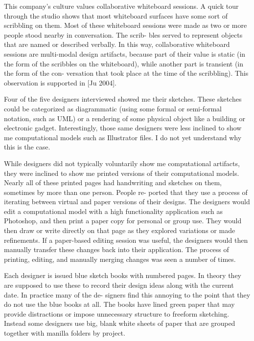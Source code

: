 This company’s culture values collaborative whiteboard sessions. A
quick tour through the studio shows that most whiteboard surfaces have
some sort of scribbling on them. Most of these whiteboard sessions
were made as two or more people stood nearby in conversation. The
scrib- bles served to represent objects that are named or described
verbally. In this way, collaborative whiteboard sessions are
multi-modal design artifacts, because part of their value is static
(in the form of the scribbles on the whiteboard), while another part
is transient (in the form of the con- versation that took place at the
time of the scribbling). This observation is supported in [Ju 2004].

Four of the five designers interviewed showed me their sketches. These
sketches could be categorized as diagrammatic (using some formal or
semi-formal notation, such as UML) or a rendering of some physical
object like a building or electronic gadget. Interestingly, those same
designers were less inclined to show me computational models such as
Illustrator files. I do not yet understand why this is the case.

While designers did not typically voluntarily show me computational
artifacts, they were inclined to show me printed versions of their
computational models. Nearly all of these printed pages had
handwriting and sketches on them, sometimes by more than one
person. People re- ported that they use a process of iterating between
virtual and paper versions of their designs. The designers would edit
a computational model with a high functionality application such as
Photoshop, and then print a paper copy for personal or group use. They
would then draw or write directly on that page as they explored
variations or made refinements. If a paper-based editing session was
useful, the designers would then manually transfer these changes back
into their application. The process of printing, editing, and manually
merging changes was seen a number of times.

Each designer is issued blue sketch books with numbered pages. In
theory they are supposed to use these to record their design ideas
along with the current date. In practice many of the de- signers find
this annoying to the point that they do not use the blue books at
all. The books have lined green paper that may provide distractions or
impose unnecessary structure to freeform sketching. Instead some
designers use big, blank white sheets of paper that are grouped
together with manilla folders by project.

